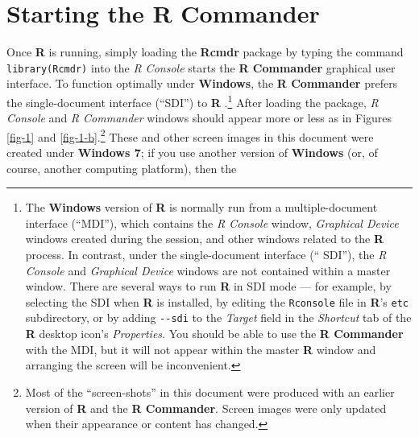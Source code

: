 \documentclass{article}%
\begin{document}
\section{Starting the R Commander}

Once \textbf{R} is running, simply loading the \textbf{Rcmdr} package by
typing the command \texttt{library(Rcmdr)} into the \emph{R Console} starts
the \textbf{R Commander} graphical user interface. To function optimally under
\textbf{Windows}, the \textbf{R Commander} prefers the single-document
interface (\textquotedblleft SDI\textquotedblright) to \textbf{R}%
.\footnote{The \textbf{Windows} version of \textbf{R} is normally run from a
multiple-document interface (\textquotedblleft MDI\textquotedblright), which
contains the \emph{R Console} window, \emph{Graphical Device} windows created
during the session, and other windows related to the \textbf{R} process. In
contrast, under the single-document interface (\textquotedblleft
SDI\textquotedblright), the \emph{R Console} and \emph{Graphical Device}
windows are not contained within a master window. There are several ways to
run \textbf{R} in SDI mode --- for example, by selecting the SDI when
\textbf{R} is installed, by editing the \texttt{Rconsole} file in \textbf{R}'s
\texttt{etc} subdirectory, or by adding \texttt{-{}-sdi} to the \emph{Target}
field in the \emph{Shortcut} tab of the \textbf{R} desktop icon's
\emph{Properties}. You should be able to use the \textbf{R Commander} with the
MDI, but it will not appear within the master \textbf{R} window and arranging
the screen will be inconvenient.} After loading the package, \emph{R Console}
and \emph{R Commander} windows should appear more or less as in Figures
\ref{fig-1} and \ref{fig-1-b}.\footnote{Most of the ``screen-shots'' in this document
were produced with an earlier version of \textbf{R} and the \textbf{R Commander}.
Screen images were only updated when their appearance or content has changed.}
These and other screen images in this document
were created under \textbf{Windows 7}; if you use another version of
\textbf{Windows} (or, of course, another computing platform), then the
\end{document}
